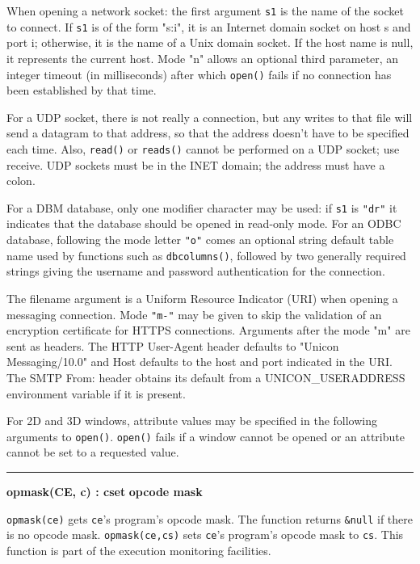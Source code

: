 When opening a network socket: the first argument \texttt{s1} is the
name of the socket to connect. If \texttt{s1} is of the form
"s:i", it is an Internet domain socket on
host s and port i; otherwise, it is the name of a Unix
domain socket. If the host name is null, it represents the current
host. Mode "n" allows an optional third parameter,
an integer timeout (in milliseconds) after which \texttt{open()} fails
if no connection has been established by that time.

For a UDP socket, there is not really a connection, but any writes to
that file will send a datagram to that address, so that the address
doesn't have to be specified each time. Also,
\texttt{read()} or \texttt{reads()} cannot be performed on a UDP
socket; use receive. UDP sockets must be in the INET domain; the
address must have a colon. 

For a DBM database, only one modifier character may be used: if
\texttt{s1} is \texttt{"dr"} it indicates that the database should be
opened in read-only mode.  For an ODBC database, following the mode
letter \texttt{"o"} comes an optional string default table name used
by functions such as \texttt{dbcolumns()}, followed by two generally
required strings giving the username and password authentication for the
connection.

The filename argument is a Uniform Resource Indicator (URI) when opening
a messaging connection. Mode \texttt{"m-"} may be given to skip the
validation of an encryption certificate for HTTPS connections.
Arguments after the mode "m" are sent as headers. The HTTP
User-Agent header defaults to "Unicon
Messaging/10.0" and Host defaults to the host and port
indicated in the URI. The SMTP From: header obtains its default from a
UNICON\_USERADDRESS environment variable if it is present.

For 2D and 3D windows, attribute values may be specified in the
following arguments to \texttt{open()}. \texttt{open()} fails if a
window cannot be opened or an attribute cannot be set to a requested
value.

\bigskip\hrule\vspace{0.1cm}
\noindent
{\bf opmask(CE, c) : cset } \hfill {\bf opcode mask}

\noindent
\texttt{opmask(ce)} gets \texttt{ce}'s
program's opcode mask. The function returns
\texttt{\&null} if there is no opcode mask. \texttt{opmask(ce,cs)} sets
\texttt{ce}'s program's opcode mask
to \texttt{cs}. This function is part of the execution monitoring
facilities.

